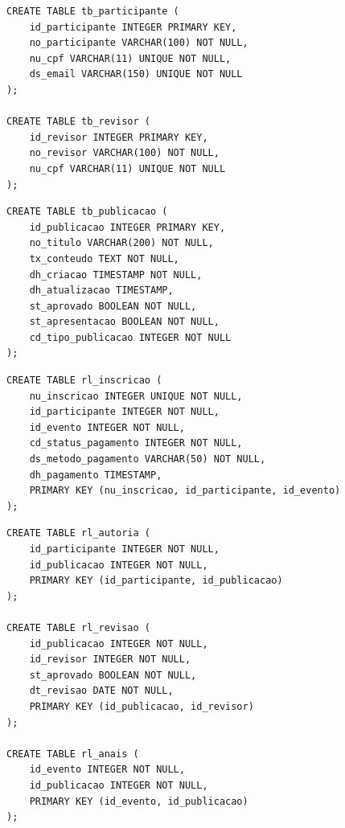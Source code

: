 \documentclass[12pt]{article}
\begin{document}
\noindent\begin{minipage}{\linewidth}
\begin{lstlisting}[caption={DDL --- entidades \texttt{tb\_participante} e \texttt{tb\_revisor}.}, label={lst:ddl-pessoas}]
CREATE TABLE tb_participante (
    id_participante INTEGER PRIMARY KEY,
    no_participante VARCHAR(100) NOT NULL,
    nu_cpf VARCHAR(11) UNIQUE NOT NULL,
    ds_email VARCHAR(150) UNIQUE NOT NULL
);

CREATE TABLE tb_revisor (
    id_revisor INTEGER PRIMARY KEY,
    no_revisor VARCHAR(100) NOT NULL,
    nu_cpf VARCHAR(11) UNIQUE NOT NULL
);
\end{lstlisting}
\end{minipage}

\noindent\begin{minipage}{\linewidth}
\begin{lstlisting}[caption={DDL --- entidade \texttt{tb\_publicacao}.}, label={lst:ddl-publicacao}]
CREATE TABLE tb_publicacao (
    id_publicacao INTEGER PRIMARY KEY,
    no_titulo VARCHAR(200) NOT NULL,
    tx_conteudo TEXT NOT NULL,
    dh_criacao TIMESTAMP NOT NULL,
    dh_atualizacao TIMESTAMP,
    st_aprovado BOOLEAN NOT NULL,
    st_apresentacao BOOLEAN NOT NULL,
    cd_tipo_publicacao INTEGER NOT NULL
);
\end{lstlisting}
\end{minipage}

\noindent\begin{minipage}{\linewidth}
\begin{lstlisting}[caption={DDL --- relacionamento \texttt{rl\_inscricao}.}, label={lst:ddl-inscricao}]
CREATE TABLE rl_inscricao (
    nu_inscricao INTEGER UNIQUE NOT NULL,
    id_participante INTEGER NOT NULL,
    id_evento INTEGER NOT NULL,
    cd_status_pagamento INTEGER NOT NULL,
    ds_metodo_pagamento VARCHAR(50) NOT NULL,
    dh_pagamento TIMESTAMP,
    PRIMARY KEY (nu_inscricao, id_participante, id_evento)
);
\end{lstlisting}
\end{minipage}

\noindent\begin{minipage}{\linewidth}
\begin{lstlisting}[caption={DDL --- relacionamentos \texttt{rl\_autoria}, \texttt{rl\_revisao} e \texttt{rl\_anais}.}, label={lst:ddl-relacionamentos}]
CREATE TABLE rl_autoria (
    id_participante INTEGER NOT NULL,
    id_publicacao INTEGER NOT NULL,
    PRIMARY KEY (id_participante, id_publicacao)
);

CREATE TABLE rl_revisao (
    id_publicacao INTEGER NOT NULL,
    id_revisor INTEGER NOT NULL,
    st_aprovado BOOLEAN NOT NULL,
    dt_revisao DATE NOT NULL,
    PRIMARY KEY (id_publicacao, id_revisor)
);

CREATE TABLE rl_anais (
    id_evento INTEGER NOT NULL,
    id_publicacao INTEGER NOT NULL,
    PRIMARY KEY (id_evento, id_publicacao)
);
\end{lstlisting}
\end{minipage}
\end{document}
